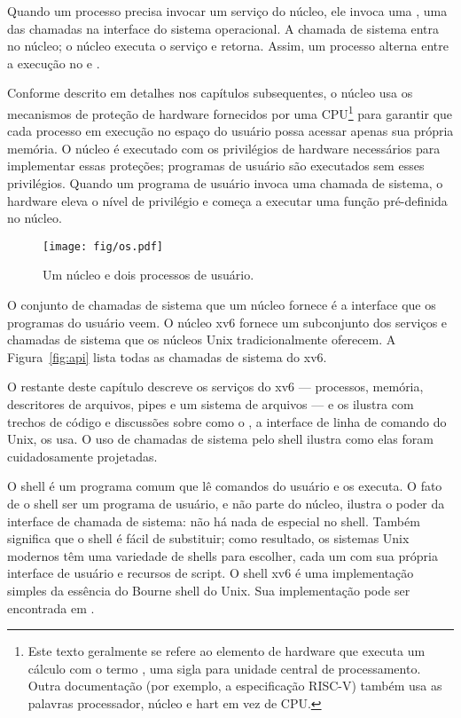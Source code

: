 Quando um
processo precisa invocar um serviço do núcleo, ele invoca
uma ,
uma das chamadas
na interface do sistema operacional.
A chamada de sistema entra no núcleo;
o núcleo executa o serviço e retorna.
Assim, um processo alterna entre a execução no
e
.

Conforme descrito em detalhes nos capítulos subsequentes, o núcleo usa os mecanismos de proteção de hardware fornecidos por uma
CPU\footnote{
Este texto geralmente se refere ao elemento de hardware que executa um
cálculo com o termo , uma sigla para unidade central de
processamento.  Outra documentação (por exemplo, a especificação RISC-V)
também usa as palavras processador, núcleo e hart em vez de CPU.
}
para
garantir que cada processo em execução no espaço do usuário possa acessar apenas
sua própria memória.
O núcleo é executado com os privilégios de hardware necessários para
implementar essas proteções; programas de usuário são executados sem
esses privilégios.
Quando um programa de usuário invoca uma chamada de sistema, o hardware
eleva o nível de privilégio e começa a executar uma
função pré-definida no núcleo.

\begin{figure}[t]
\center
\texttt{[image: fig/os.pdf]}
\caption{Um núcleo e dois processos de usuário.}
\label{fig:os}
\end{figure}

O conjunto de chamadas de sistema que um núcleo fornece
é a interface que os programas do usuário veem.
O núcleo xv6 fornece um subconjunto dos serviços e chamadas de sistema
que os núcleos Unix tradicionalmente oferecem. A
Figura~\ref{fig:api}
lista todas as chamadas de sistema do xv6.

O restante deste capítulo descreve os serviços do xv6 --- processos, memória,
descritores de arquivos, pipes e um sistema de arquivos --- e os ilustra com
trechos de código e discussões sobre como o ,
a interface de linha de comando do Unix, os usa.
O uso de chamadas de sistema pelo shell ilustra como elas foram cuidadosamente
projetadas.

O shell é um programa comum que lê comandos do usuário
e os executa.
O fato de o shell ser um programa de usuário, e não parte do núcleo,
ilustra o poder da interface de chamada de sistema: não há nada
de especial no shell.
Também significa que o shell é fácil de substituir; como resultado,
os sistemas Unix modernos têm uma variedade de
shells para escolher, cada um com sua própria interface de usuário
e recursos de script.
O shell xv6 é uma implementação simples da essência do
Bourne shell do Unix.  Sua implementação pode ser encontrada em
.
